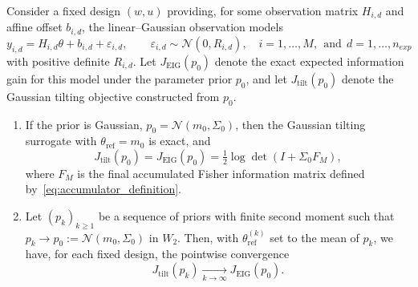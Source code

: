\documentclass[10pt,a4paper]{amsart}
\begin{document}
\begin{proposition}
\label{prop:consistency_LG}
Consider a fixed design $(w, u)$ providing, for some observation matrix $H_{i, d}$ and  affine offset $b_{i,d}$, the linear--Gaussian observation models
\[
y_{i, d} = H_{i, d} \theta + b_{i, d} + \varepsilon_{i, d},
\qquad \varepsilon_{i, d} \sim \mathcal N(0,R_{i, d}),
\quad i=1,\dots,M, ~~\text{and}~~ d=1,\dots,n_{exp}
\]
with positive definite $R_{i, d}$. Let $J_{\mathrm{EIG}}(p_0)$ denote the exact expected information gain for this model under the parameter prior $p_0$, and let $J_{\mathrm{tilt}}(p_0)$ denote the Gaussian tilting objective constructed
from $p_0$.
\begin{enumerate}
\item
If the prior is Gaussian, $p_0=\mathcal N(m_0,\Sigma_0)$, then the Gaussian tilting
surrogate with $\theta_\mathrm{ref}=m_0$ is exact, and
\[
J_{\mathrm{tilt}}(p_0) = J_{\mathrm{EIG}}(p_0) = \tfrac{1}{2}\log\det(I + \Sigma_0 F_M),
\]
where \(F_M\) is the final accumulated Fisher information matrix defined
by~\eqref{eq:accumulator_definition}.
\item
Let $(p_k)_{k\ge1}$ be a sequence of priors with finite second moment such that
$p_k \to p_0:=\mathcal N(m_0,\Sigma_0)$ in $W_2$. Then, with \(\theta_{\mathrm{ref}}^{(k)}\) set to the mean of \(p_k\), we have,
for each fixed design, the pointwise convergence
\[
J_{\mathrm{tilt}}(p_k)
\xrightarrow[k\to\infty]{}
J_{\mathrm{EIG}}(p_0).
\]
\end{enumerate}
\end{proposition} 
\end{document}

